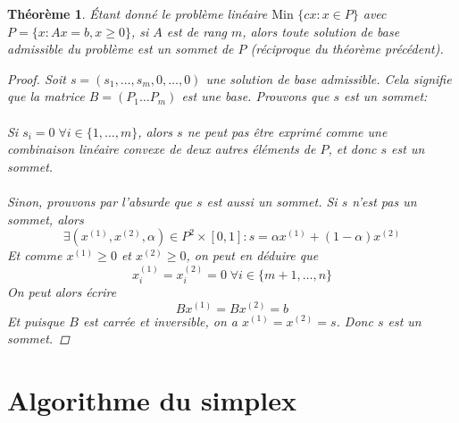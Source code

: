\documentclass[a4paper]{report}
\theoremstyle{definition}
\theoremstyle{remark}
\theoremstyle{plain}
\newtheorem{theorem}{Théorème}
\begin{document}
\begin{theorem}
Étant donné le problème linéaire \(\text{Min }\{cx:x\in P\}\) avec
\(P = \{x:Ax=b,x\ge 0\}\), si \(A\) est de rang \(m\), alors toute solution de
base admissible du problème est un sommet de \(P\) (réciproque du théorème
précédent).
\begin{proof}
Soit \(s=(s_1,\dots,s_m,0,\dots,0)\) une solution de base admissible. Cela
signifie que la matrice \(B=(P_1\dots P_m)\) est une base. Prouvons que \(s\)
est un sommet:
\paragraph{}
Si \(s_i=0\;\forall i\in\{1,\dots,m\}\), alors \(s\) ne peut pas être exprimé comme une
combinaison linéaire convexe de deux autres éléments de \(P\), et donc \(s\) est
un sommet.
\paragraph{}
Sinon, prouvons par l'absurde que \(s\) est aussi un sommet. Si \(s\) n'est pas
un sommet, alors
\[\exists (x^{(1)},x^{(2)},\alpha)\in P^2\times[0,1]:s=\alpha x^{(1)}+(1-\alpha)x^{(2)}\]
Et comme \(x^{(1)}\ge0\) et \(x^{(2)}\ge0\), on peut en déduire que
\[x^{(1)}_i=x^{(2)}_i=0\;\forall i\in\{m+1,\dots,n\}\]
On peut alors écrire
\[Bx^{(1)}=Bx^{(2)}=b\]
Et puisque \(B\) est carrée et inversible, on a \(x^{(1)}=x^{(2)}=s\).
Donc \(s\) est un sommet.
\end{proof}
\end{theorem}

\section{Algorithme du simplex}
\end{document}
